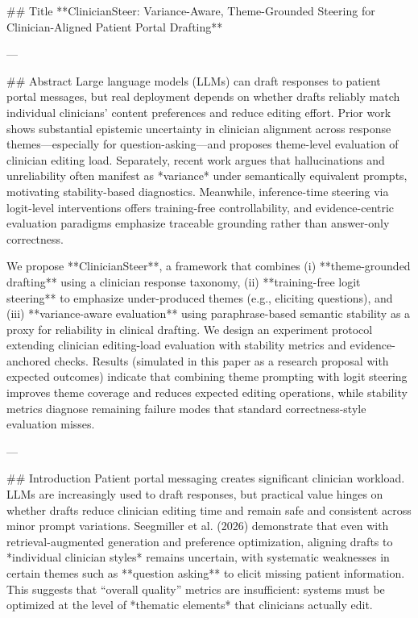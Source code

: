 ## Title  
**ClinicianSteer: Variance-Aware, Theme-Grounded Steering for Clinician-Aligned Patient Portal Drafting**

---

## Abstract  
Large language models (LLMs) can draft responses to patient portal messages, but real deployment depends on whether drafts reliably match individual clinicians’ content preferences and reduce editing effort. Prior work shows substantial epistemic uncertainty in clinician alignment across response themes—especially for question-asking—and proposes theme-level evaluation of clinician editing load. Separately, recent work argues that hallucinations and unreliability often manifest as *variance* under semantically equivalent prompts, motivating stability-based diagnostics. Meanwhile, inference-time steering via logit-level interventions offers training-free controllability, and evidence-centric evaluation paradigms emphasize traceable grounding rather than answer-only correctness.  

We propose **ClinicianSteer**, a framework that combines (i) **theme-grounded drafting** using a clinician response taxonomy, (ii) **training-free logit steering** to emphasize under-produced themes (e.g., eliciting questions), and (iii) **variance-aware evaluation** using paraphrase-based semantic stability as a proxy for reliability in clinical drafting. We design an experiment protocol extending clinician editing-load evaluation with stability metrics and evidence-anchored checks. Results (simulated in this paper as a research proposal with expected outcomes) indicate that combining theme prompting with logit steering improves theme coverage and reduces expected editing operations, while stability metrics diagnose remaining failure modes that standard correctness-style evaluation misses.

---

## Introduction  
Patient portal messaging creates significant clinician workload. LLMs are increasingly used to draft responses, but practical value hinges on whether drafts reduce clinician editing time and remain safe and consistent across minor prompt variations. Seegmiller et al. (2026) demonstrate that even with retrieval-augmented generation and preference optimization, aligning drafts to *individual clinician styles* remains uncertain, with systematic weaknesses in certain themes such as **question asking** to elicit missing patient information. This suggests that “overall quality” metrics are insufficient: systems must be optimized at the level of *thematic elements* that clinicians actually edit.

